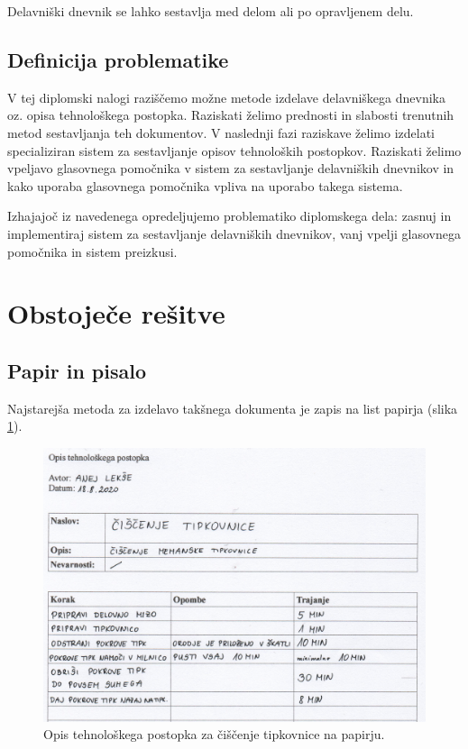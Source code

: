 \documentclass[a4paper, 12pt]{book}
\begin{document}


Delavniški dnevnik se lahko sestavlja med delom ali po opravljenem delu.

\subsection{Definicija problematike}

V tej diplomski nalogi raziščemo možne metode izdelave delavniškega dnevnika oz. opisa tehnološkega postopka.
Raziskati želimo prednosti in slabosti trenutnih metod sestavljanja teh dokumentov.
V naslednji fazi raziskave želimo izdelati specializiran sistem za sestavljanje opisov tehnoloških postopkov.
Raziskati želimo vpeljavo glasovnega pomočnika v sistem za sestavljanje delavniških dnevnikov in kako uporaba glasovnega pomočnika vpliva na uporabo takega sistema.


Izhajajoč iz navedenega opredeljujemo problematiko diplomskega dela: zasnuj in implementiraj sistem za sestavljanje delavniških dnevnikov, vanj vpelji glasovnega pomočnika in sistem preizkusi.

\section{Obstoječe rešitve}

\subsection{Papir in pisalo}

Najstarejša metoda za izdelavo takšnega dokumenta je zapis na list papirja (slika \ref{paper}).

\begin{figure}[H]
\begin{center}
\includegraphics[width=13.5cm]{report_paper_small}
\end{center}
\caption{Opis tehnološkega postopka za čiščenje tipkovnice na papirju.}
\label{paper}
\end{figure}
\end{document}
